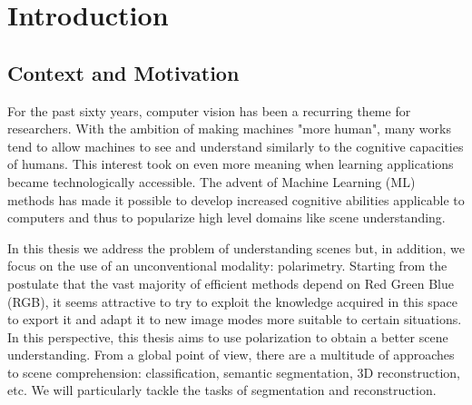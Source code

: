 
\chapter{Introduction} %

\label{Chapter1} %


\newcommand{\keyword}[1]{\textbf{#1}}
\newcommand{\tabhead}[1]{\textbf{#1}}
\newcommand{\code}[1]{\texttt{#1}}
\newcommand{\file}[1]{\texttt{\bfseries#1}}
\newcommand{\option}[1]{\texttt{\itshape#1}}


\section{Context and Motivation}

For the past sixty years, computer vision has been a recurring theme for researchers. With the ambition of making machines "more human", many works tend to allow machines to see and understand similarly to the cognitive capacities of humans. This interest took on even more meaning when learning applications became technologically accessible. The advent of Machine Learning (ML) methods has made it possible to develop increased cognitive abilities applicable to computers and thus to popularize high level domains like scene understanding.

In this thesis we address the problem of understanding scenes but, in addition, we focus on the use of an unconventional modality: polarimetry. Starting from the postulate that the vast majority of efficient methods depend on Red Green Blue (RGB), it seems attractive to try to exploit the knowledge acquired in this space to export it and adapt it to new image modes more suitable to certain situations.
In this perspective, this thesis aims to use polarization to obtain a better scene understanding.
From a global point of view, there are a multitude of approaches to scene comprehension: classification, semantic segmentation, 3D reconstruction, etc. We will particularly tackle the tasks of segmentation and reconstruction. 


